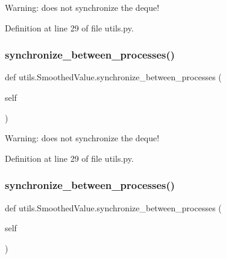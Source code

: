 \begin{DoxyVerb}Warning: does not synchronize the deque!
\end{DoxyVerb}
 

Definition at line 29 of file utils.\+py.

\mbox{\label{classutils_1_1SmoothedValue_a8d10c867abf46adb6b0be5b6adcf1236}} 
\subsubsection{\texorpdfstring{synchronize\+\_\+between\+\_\+processes()}{synchronize\_between\_processes()}\hspace{0.1cm}{\footnotesize\ttfamily [2/5]}}
{\footnotesize\ttfamily def utils.\+Smoothed\+Value.\+synchronize\+\_\+between\+\_\+processes (\begin{DoxyParamCaption}\item[{}]{self }\end{DoxyParamCaption})}

\begin{DoxyVerb}Warning: does not synchronize the deque!
\end{DoxyVerb}
 

Definition at line 29 of file utils.\+py.

\mbox{\label{classutils_1_1SmoothedValue_a8d10c867abf46adb6b0be5b6adcf1236}} 
\subsubsection{\texorpdfstring{synchronize\+\_\+between\+\_\+processes()}{synchronize\_between\_processes()}\hspace{0.1cm}{\footnotesize\ttfamily [3/5]}}
{\footnotesize\ttfamily def utils.\+Smoothed\+Value.\+synchronize\+\_\+between\+\_\+processes (\begin{DoxyParamCaption}\item[{}]{self }\end{DoxyParamCaption})}

